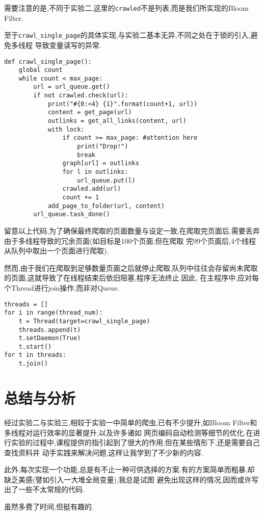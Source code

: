 \documentclass[a4paper]{article}
\begin{document}
需要注意的是,不同于实验二,这里的\texttt{crawled}不是列表,而是我们所实现的Bloom Filter.

至于\texttt{crawl_single_page}的具体实现,与实验二基本无异,不同之处在于锁的引入,避免多线程
导致变量读写的异常.
\begin{verbatim}
def crawl_single_page():
    global count
    while count < max_page:
        url = url_queue.get()
        if not crawled.check(url):
            print("#{0:<4} {1}".format(count+1, url))
            content = get_page(url)
            outlinks = get_all_links(content, url)
            with lock:
                if count >= max_page: #attention here
                    print("Drop!")
                    break
                graph[url] = outlinks
                for l in outlinks:
                    url_queue.put(l)
                crawled.add(url)
                count += 1
            add_page_to_folder(url, content)
        url_queue.task_done()
\end{verbatim}

留意以上代码,为了确保最终爬取的页面数量与设定一致,在爬取完页面后,需要丢弃由于多线程导致的冗余页面(如目标是100个页面,但在爬取
完99个页面后,4个线程从队列中取出一个页面进行爬取).

然而,由于我们在爬取到足够数量页面之后就停止爬取,队列中往往会存留尚未爬取的页面,这就导致了在线程结束后依旧阻塞,程序无法终止.因此,
在主程序中,应对每个Thread进行join操作,而非对Queue.
\begin{verbatim}
threads = []
for i in range(thread_num):
    t = Thread(target=crawl_single_page)
    threads.append(t)
    t.setDaemon(True)
    t.start()
for t in threads:
    t.join()
\end{verbatim}
    \newpage
    \section{总结与分析}
经过实验二与实验三,相较于实验一中简单的爬虫,已有不少提升,如Bloom Filter和多线程对运行效率的显著提升,以及许多诸如
网页编码自动检测等细节的优化.在进行实验的过程中,课程提供的指引起到了很大的作用,但在某些情形下,还是需要自己查找资料并
动手实践来解决问题,这样让我学到了不少新的内容.

此外,每次实现一个功能,总是有不止一种可供选择的方案.有的方案简单而粗暴,却缺乏美感(譬如引入一大堆全局变量),我总是试图
避免出现这样的情况,因而或许写出了一些不太常规的代码.

虽然多费了时间,但挺有趣的.
\end{document}
